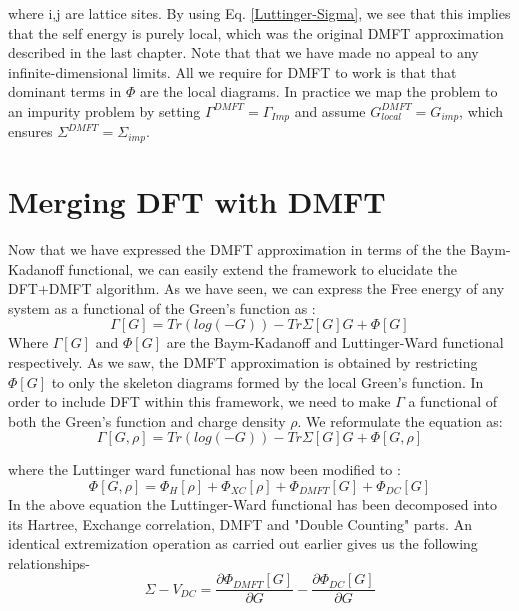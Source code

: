 \documentclass[10pt]{ruthesis}
\begin{document}
where i,j are lattice sites. By using Eq. \ref{Luttinger-Sigma}, we see that this implies that the self energy is purely local, which was the original DMFT approximation described in the last chapter. Note that that we have made no appeal to any infinite-dimensional limits. All we require for DMFT to work is that that dominant terms in $\Phi$ are the local diagrams. In practice we map the problem to an impurity problem by setting  $\Gamma^{DMFT}=\Gamma_{Imp}$ and assume $G^{DMFT}_{local}= G_{imp}$, which ensures $\Sigma^{DMFT}= \Sigma_{imp}$.
 
\section{Merging DFT with DMFT} 

Now that we have expressed the DMFT approximation in terms of the the Baym-Kadanoff functional, we can easily extend the framework to elucidate the DFT+DMFT algorithm. As we have seen, we can express the Free energy of any system as a functional of the Green's function as :
\begin{equation}
\Gamma[G]= Tr(log(-G)) -Tr \Sigma[G]G +\Phi[G]
\end{equation}
Where $\Gamma[G]$ and $\Phi[G]$ are the Baym-Kadanoff and Luttinger-Ward functional respectively. As we saw, the DMFT approximation is obtained by restricting $\Phi[G]$ to only the skeleton diagrams formed by the local Green's function. In order to include DFT within this framework, we need to make $\Gamma$ a functional of both the Green's function and charge density $\rho$. We reformulate the equation as:
\begin{equation}
 \Gamma[G,\rho]= Tr(log(-G)) -Tr \Sigma[G]G +\Phi[G,\rho]
\end{equation}  
 
 where the Luttinger ward functional has now been modified to :
 \begin{equation}
 \Phi[G,\rho]=\Phi_{H}[\rho]+\Phi_{XC}[\rho]+\Phi_{DMFT}[G]+\Phi_{DC}[G]
 \end{equation}
 In the above equation the Luttinger-Ward functional has been decomposed into its Hartree, Exchange correlation, DMFT and "Double Counting" parts.  An identical extremization operation as carried out earlier gives us the following relationships-
\begin{equation}\label{DMFT_SC}
 \Sigma-V_{DC}=  \dfrac{\partial \Phi_{DMFT}[G]}{\partial G}- \dfrac{\partial \Phi_{DC}[G]}{\partial G}
 \end{equation} 
 
\end{document}
